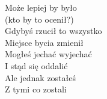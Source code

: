 \begin{text}
    \vin Może lepiej by było\\
    \vin (kto by to ocenił?)\\
    \vin Gdybyś rzucił to wszystko\\
    \vin Miejsce bycia zmienił\\
    \vin Mogłeś jechać wyjechać\\
    \vin I stąd się oddalić\\
    \vin Ale jednak zostałeś\\
    \vin Z tymi co zostali
\end{text}
\begin{chord}

\end{chord}